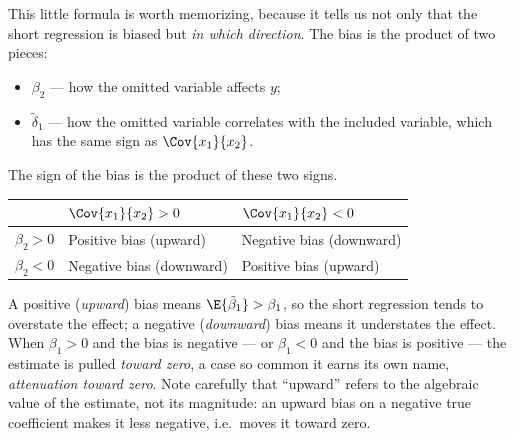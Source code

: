 

This little formula is worth memorizing, because it tells us not only that the short regression is biased but \emph{in which direction}. The bias is the product of two pieces:
\begin{itemize}
    \item $\beta_2$ --- how the omitted variable affects $y$;
    \item $\tilde\delta_1$ --- how the omitted variable correlates with the included variable, which has the same sign as $\Cov{x_1}{x_2}$.
\end{itemize}
The sign of the bias is the product of these two signs.

\begin{center}
\renewcommand{\arraystretch}{1.5}
\begin{tabular}{@{}lll@{}}
\toprule
 & $\Cov{x_1}{x_2} > 0$ & $\Cov{x_1}{x_2} < 0$ \\
\midrule
$\beta_2 > 0$ & Positive bias (upward) & Negative bias (downward) \\
$\beta_2 < 0$ & Negative bias (downward) & Positive bias (upward) \\
\bottomrule
\end{tabular}
\end{center}

A positive (\emph{upward}) bias means $\E{\tilde\beta_1} > \beta_1$, so the short regression tends to overstate the effect; a negative (\emph{downward}) bias means it understates the effect. When $\beta_1 > 0$ and the bias is negative --- or $\beta_1 < 0$ and the bias is positive --- the estimate is pulled \emph{toward zero}, a case so common it earns its own name, \emph{attenuation toward zero}. Note carefully that ``upward'' refers to the algebraic value of the estimate, not its magnitude: an upward bias on a negative true coefficient makes it less negative, i.e.\ moves it toward zero.


